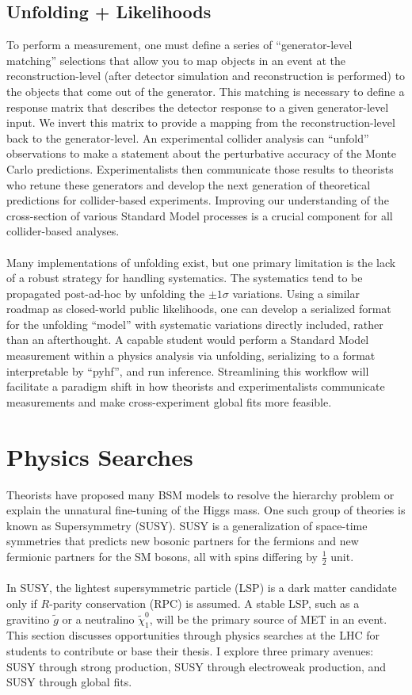 \documentclass[10pt,a4paper,sans]{moderncv/moderncv} %
\begin{document}
\subsection{Unfolding + Likelihoods}
To perform a measurement, one must define a series of ``generator-level matching'' selections that allow you to map objects in an event at the reconstruction-level (after detector simulation and reconstruction is performed) to the objects that come out of the generator. This matching is necessary to define a response matrix that describes the detector response to a given generator-level input. We invert this matrix to provide a mapping from the reconstruction-level back to the generator-level. An experimental collider analysis can ``unfold'' observations to make a statement about the perturbative accuracy of the Monte Carlo predictions. Experimentalists then communicate those results to theorists who retune these generators and develop the next generation of theoretical predictions for collider-based experiments. Improving our understanding of the cross-section of various Standard Model processes is a crucial component for all collider-based analyses.
\\
\\
Many implementations of unfolding exist, but one primary limitation is the lack of a robust strategy for handling systematics. The systematics tend to be propagated post-ad-hoc by unfolding the $\pm 1 \sigma$ variations. Using a similar roadmap as closed-world public likelihoods, one can develop a serialized format for the unfolding ``model''  with systematic variations directly included, rather than an afterthought. A capable student would perform a Standard Model measurement within a physics analysis via unfolding, serializing to a format interpretable by ``pyhf'', and run inference. Streamlining this workflow will facilitate a paradigm shift in how theorists and experimentalists communicate measurements and make cross-experiment global fits more feasible.

\section{Physics Searches}
Theorists have proposed many BSM models to resolve the hierarchy problem or explain the unnatural fine-tuning of the Higgs mass. One such group of theories is known as Supersymmetry (SUSY). SUSY is a generalization of space-time symmetries that predicts new bosonic partners for the fermions and new fermionic partners for the SM bosons, all with spins differing by $\frac{1}{2}$ unit.
\\
\\
In SUSY, the lightest supersymmetric particle (LSP) is a dark matter candidate only if $R$-parity conservation (RPC) is assumed. A stable LSP, such as a gravitino $\tilde{g}$ or a neutralino $\tilde{\chi}_1^0$, will be the primary source of MET in an event. This section discusses opportunities through physics searches at the LHC for students to contribute or base their thesis. I explore three primary avenues: SUSY through strong production, SUSY through electroweak production, and SUSY through global fits.
\end{document}
